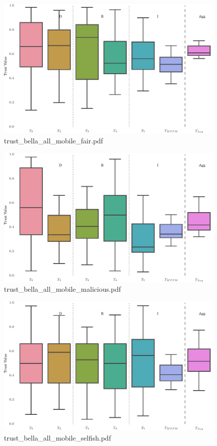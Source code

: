 \documentclass{article}
\begin{document}
\begin{figure}[h!]
\centering
\includegraphics[width=\linewidth]{trust_bella_all_mobile_fair.pdf}
\caption{trust\_bella\_all\_mobile\_fair.pdf}
\end{figure}




\begin{figure}[h!]
\centering
\includegraphics[width=\linewidth]{trust_bella_all_mobile_malicious.pdf}
\caption{trust\_bella\_all\_mobile\_malicious.pdf}
\end{figure}




\begin{figure}[h!]
\centering
\includegraphics[width=\linewidth]{trust_bella_all_mobile_selfish.pdf}
\caption{trust\_bella\_all\_mobile\_selfish.pdf}
\end{figure}
\end{document}
